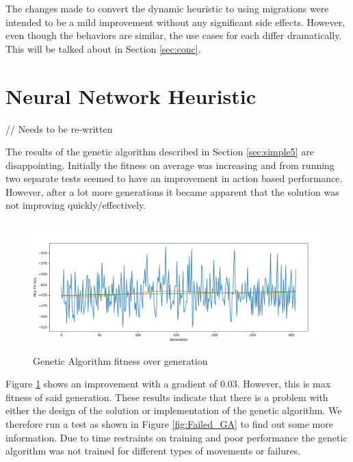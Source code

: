 \documentclass{UoYCSproject}
\begin{document}
The changes made to convert the dynamic heuristic to using migrations were intended to be a mild improvement without any significant side effects. 
However, even though the behaviors are similar, the use cases for each differ dramatically. 
This will be talked about in Section \ref{sec:conc}.

\section{Neural Network Heuristic}
\label{sec:simple5a}

// Needs to be re-written

The results of the genetic algorithm described in Section \ref{sec:simple5} are disappointing. 
Initially the fitness on average was increasing and from running two separate tests seemed to have an improvement in action based performance. 
However, after a lot more generations it became apparent that the solution was not improving quickly/effectively. 

\begin{figure}[htb]
\label{fig:FitnessGA}
\begin{center}
\centering
\includegraphics[height=5cm]{"./GA_max_fitness_0.03_gradient.png"}
\caption{Genetic Algorithm fitness over generation}
\end{center}
\end{figure}

Figure \ref{fig:FitnessGA} shows an improvement with a gradient of 0.03. 
However, this is max fitness of said generation. 
These results indicate that there is a problem with either the design of the solution or implementation of the genetic algorithm. 
We therefore run a test as shown in Figure \ref{fig:Failed_GA} to find out some more information. 
Due to time restraints on training and poor performance the genetic algorithm was not trained for different types of movements or failures.
\end{document}

